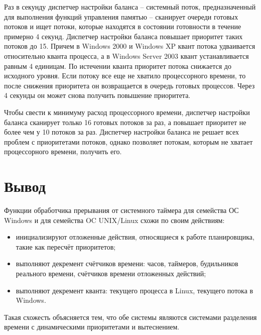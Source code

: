 Раз в секунду диспетчер настройки баланса -- системный поток, предназначенный для выполнения функций управления памятью -- сканирует очереди готовых потоков и ищет потоки, которые находятся в состоянии готовности в течение примерно 4 секунд. Диспетчер настройки баланса повышает приоритет таких потоков до 15. Причем в {\ttfamily Windows 2000} и {\ttfamily Windows XP} квант потока удваивается относительно кванта процесса, а в {\ttfamily Windows Server 2003} квант устанавливается равным 4 единицам. По истечении кванта приоритет потока снижается до исходного уровня. Если потоку все еще не хватило процессорного времени, то после снижения приоритета он возвращается в очередь готовых процессов. Через 4 секунды он может снова получить повышение приоритета.

Чтобы свести к минимуму расход процессорного времени, диспетчер настройки баланса сканирует только 16 готовых потоков за раз, а повышает приоритет не более чем у 10 потоков за раз.
Диспетчер настройки баланса не решает всех проблем с приоритетами потоков, однако позволяет потокам, которым не хватает процессорного времени, получить его.

\chapter*{Вывод}

Функции обработчика прерывания от системного таймера для семейства ОС {\ttfamily Windows} и для семейства OC {\ttfamily UNIX/Linux} схожи по своим действиям:
\begin{itemize}
	\item инициализируют отложенные действия, относящиеся к работе планировщика, такие как пересчёт приоритетов;
	\item выполняют декремент счётчиков времени: часов, таймеров, будильников реального времени, счётчиков времени отложенных действий;
	\item выполняют декремент кванта: текущего процесса в {\ttfamily Linux}, текущего потока в {\ttfamily Windows}.
\end{itemize}

Такая схожесть объясняется тем, что обе системы являются системами разделения времени с динамическими приоритетами и вытеснением.

